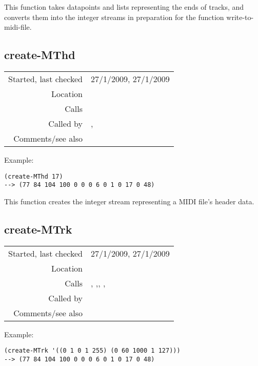 \noindent This function takes datapoints and lists
representing the ends of tracks, and converts them
into the integer streams in preparation for the
function write-to-midi-file.


\subsection*{create-MThd}\label{fun:create-MThd}

\vspace{0.3cm}
\begin{tabular}{r|p{8cm}}
Started, last checked & 27/1/2009, 27/1/2009 \\
Location & \nameref{sec:MIDI-export} \\
Calls & \\
Called by & \nameref{fun:save-as-midi}, \nameref{fun:saveit} \\
Comments/see also &
\end{tabular}

\vspace{0.5cm}
\noindent Example:
\begin{verbatim}
(create-MThd 17)
--> (77 84 104 100 0 0 0 6 0 1 0 17 0 48)
\end{verbatim}

\noindent This function creates the integer stream
representing a MIDI file's header data.


\subsection*{create-MTrk}\label{fun:create-MTrk}

\vspace{0.3cm}
\begin{tabular}{r|p{8cm}}
Started, last checked & 27/1/2009, 27/1/2009 \\
Location & \nameref{sec:MIDI-export} \\
Calls & \nameref{fun:create-midi-events}, \nameref{fun:create-midi-track-data},\newline \nameref{fun:fix-deltatime}, \nameref{fun:sort-by-deltatime}, \nameref{fun:split-bytes} \\
Called by & \nameref{fun:create-midi-tracks} \\
Comments/see also &
\end{tabular}

\vspace{0.5cm}
\noindent Example:
\begin{verbatim}
(create-MTrk '((0 1 0 1 255) (0 60 1000 1 127)))
--> (77 84 104 100 0 0 0 6 0 1 0 17 0 48)
\end{verbatim}

